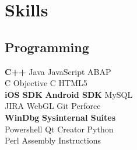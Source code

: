 \documentclass[letterpaper]{kishore-resume} %
\begin{document}
\begin{minipage}[t]{0.33\textwidth}

\section{Skills}

\subsection{Programming}

\textbf{C++} \textbullet{} Java \textbullet{} JavaScript \textbullet{} 
ABAP \\
C \textbullet{} Objective C 
\textbullet{} HTML5\\
\textbf{iOS SDK} \textbullet{} \textbf{Android SDK} \textbullet{} MySQL \\ \textbullet{} 
JIRA \textbullet{} WebGL  \textbullet{} Git \textbullet{} Perforce \\ \textbullet{} \textbf{WinDbg} \textbullet{} \textbf{Sysinternal Suites} \\ \textbullet{} Powershell \textbullet{} Qt Creator \textbullet{} Python \\ \textbullet{} Perl \textbullet{} Assembly Instructions



\end{minipage} %
\hfill
%
%
\end{document}
